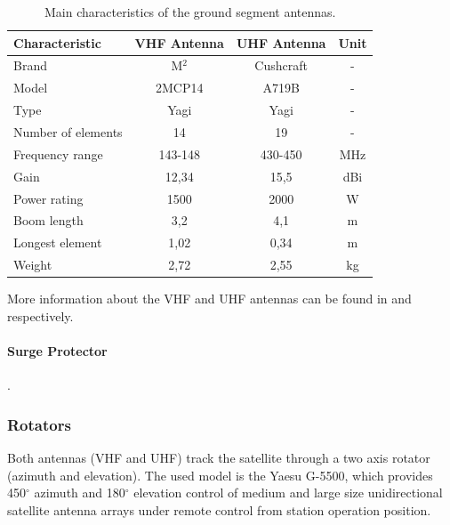 \begin{table}[ht]
    \centering
    \begin{tabular}{lccc}
        \toprule[1.5pt]
        \textbf{Characteristic} & \textbf{VHF Antenna}  & \textbf{UHF Antenna}  & \textbf{Unit} \\
        \midrule
        Brand                   & M$^{2}$               & Cushcraft             & - \\
        Model                   & 2MCP14                & A719B                 & - \\
        Type                    & Yagi                  & Yagi                  & - \\
        Number of elements      & 14                    & 19                    & - \\
        Frequency range         & 143-148               & 430-450               & MHz \\
        Gain                    & 12,34                 & 15,5                  & dBi \\
        Power rating            & 1500                  & 2000                  & W \\
        Boom length             & 3,2                   & 4,1                   & m \\
        Longest element         & 1,02                  & 0,34                  & m \\
        Weight                  & 2,72                  & 2,55                  & kg \\
        \bottomrule[1.5pt]
    \end{tabular}
    \caption{Main characteristics of the ground segment antennas.}
    \label{tab:grs-antennas}
\end{table}

More information about the VHF and UHF antennas can be found in \cite{2mcp14} and \cite{a719b} respectively.

\paragraph{Surge Protector}

.

\subsubsection{Rotators}

Both antennas (VHF and UHF) track the satellite through a two axis rotator (azimuth and elevation). The used model is the Yaesu G-5500, which provides 450$^{\circ}$ azimuth and 180$^{\circ}$ elevation control of medium and large size unidirectional satellite antenna arrays under remote control from station operation position.

